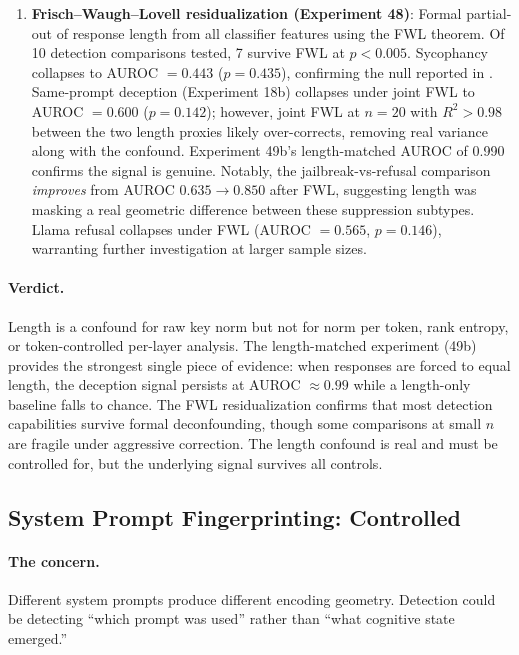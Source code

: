 \begin{enumerate}[leftmargin=*]
    \item \textbf{Frisch--Waugh--Lovell residualization (Experiment 48)}: Formal partial-out of response length from all classifier features using the FWL theorem. Of 10 detection comparisons tested, 7 survive FWL at $p < 0.005$. Sycophancy collapses to AUROC $= 0.443$ ($p = 0.435$), confirming the null reported in . Same-prompt deception (Experiment 18b) collapses under joint FWL to AUROC $= 0.600$ ($p = 0.142$); however, joint FWL at $n = 20$ with $R^{2} > 0.98$ between the two length proxies likely over-corrects, removing real variance along with the confound. Experiment 49b's length-matched AUROC of 0.990 confirms the signal is genuine. Notably, the jailbreak-vs-refusal comparison \emph{improves} from AUROC $0.635 \to 0.850$ after FWL, suggesting length was masking a real geometric difference between these suppression subtypes. Llama refusal collapses under FWL (AUROC $= 0.565$, $p = 0.146$), warranting further investigation at larger sample sizes.
\end{enumerate}

\paragraph{Verdict.} Length is a confound for raw key norm but not for norm per token, rank entropy, or token-controlled per-layer analysis. The length-matched experiment (49b) provides the strongest single piece of evidence: when responses are forced to equal length, the deception signal persists at AUROC $\approx 0.99$ while a length-only baseline falls to chance. The FWL residualization confirms that most detection capabilities survive formal deconfounding, though some comparisons at small $n$ are fragile under aggressive correction. The length confound is real and must be controlled for, but the underlying signal survives all controls.

\subsection{System Prompt Fingerprinting: Controlled}
\label{sec:fingerprint}

\paragraph{The concern.} Different system prompts produce different encoding geometry. Detection could be detecting ``which prompt was used'' rather than ``what cognitive state emerged.''

